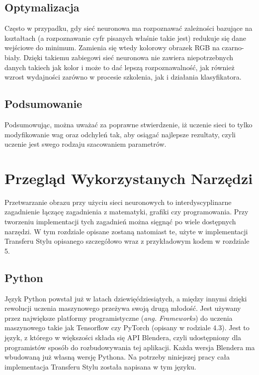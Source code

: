 \documentclass[openright]{xmgr}
\begin{document}
 \section{Optymalizacja \label{s:dsssl}}
 
\indent \indent Często w przypadku, gdy sieć neuronowa ma rozpoznawać zależności bazujące na kształtach (a rozpoznawanie cyfr pisanych właśnie takie jest) redukuje się dane wejściowe do minimum. Zamienia się wtedy kolorowy obrazek RGB na czarno-biały. Dzięki takiemu zabiegowi sieć neuronowa nie zawiera  niepotrzebnych danych takiech jak kolor i może to dać lepszą rozpoznawalność, jak również wzrost wydajności zarówno w procesie szkolenia, jak i działania klasyfikatora.  



 \section{Podsumowanie \label{s:dsssl}}
 
\indent \indent Podsumowując, można uważać za  poprawne stwierdzenie, iż uczenie sieci to tylko modyfikowanie wag oraz odchyleń tak, aby osiągać najlepsze rezultaty, czyli uczenie jest swego rodzaju szacowaniem parametrów.   



\chapter{Przegląd Wykorzystanych Narzędzi}

\indent \indent Przetwarzanie obrazu przy użyciu sieci neuronowych to interdyscyplinarne zagadnienie łączącę zagadnienia z matematyki, grafiki czy programowania. Przy tworzeniu implementacji tych zagadnień można sięgnąć po wiele dostępnych narzędzi. W tym rozdziale opisane zostaną natomiast te, użyte w implementacji Transferu Stylu opisanego szczegółowo wraz z przykładowym kodem w rozdziale 5.

\section{Python\label{s:dsssl}}

\indent \indent Język Python powstał już w latach dziewięćdziesiątych, a między innymi dzięki rewolucji uczenia maszynowego przeżywa swoją drugą młodość. Jest używany przez największe platformy programistyczne (\textit{ang. Frameworks}) do uczenia maszynowego takie jak Tensorflow czy PyTorch (opisany w rodziale 4.3).
Jest to język, z którego w większości składa się API Blendera, czyli udostępniony dla programistów sposób do rozbudowywania tej aplikacji. Każda wersja Blendera ma wbudowaną już własną wersję Pythona. Na potrzeby niniejszej pracy cała implementacja Transferu Stylu została napisana w tym języku.
\end{document}
